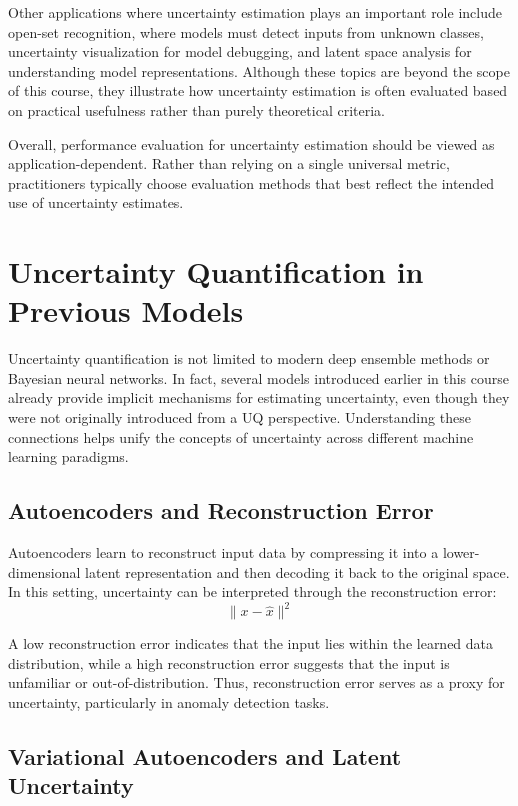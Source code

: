\documentclass{article}
\begin{document}
Other applications where uncertainty estimation plays an important role include open-set recognition, where models must detect inputs from unknown classes, uncertainty visualization for model debugging, and latent space analysis for understanding model representations. Although these topics are beyond the scope of this course, they illustrate how uncertainty estimation is often evaluated based on practical usefulness rather than purely theoretical criteria.

Overall, performance evaluation for uncertainty estimation should be viewed as application-dependent. Rather than relying on a single universal metric, practitioners typically choose evaluation methods that best reflect the intended use of uncertainty estimates.

\section{Uncertainty Quantification in Previous Models}

Uncertainty quantification is not limited to modern deep ensemble methods or Bayesian neural networks. In fact, several models introduced earlier in this course already provide implicit mechanisms for estimating uncertainty, even though they were not originally introduced from a UQ perspective. Understanding these connections helps unify the concepts of uncertainty across different machine learning paradigms.

\subsection{Autoencoders and Reconstruction Error}

Autoencoders learn to reconstruct input data by compressing it into a lower-dimensional latent representation and then decoding it back to the original space. In this setting, uncertainty can be interpreted through the reconstruction error:
\[
\|x - \hat{x}\|^2
\]

A low reconstruction error indicates that the input lies within the learned data distribution, while a high reconstruction error suggests that the input is unfamiliar or out-of-distribution. Thus, reconstruction error serves as a proxy for uncertainty, particularly in anomaly detection tasks.

\subsection{Variational Autoencoders and Latent Uncertainty}
\end{document}
